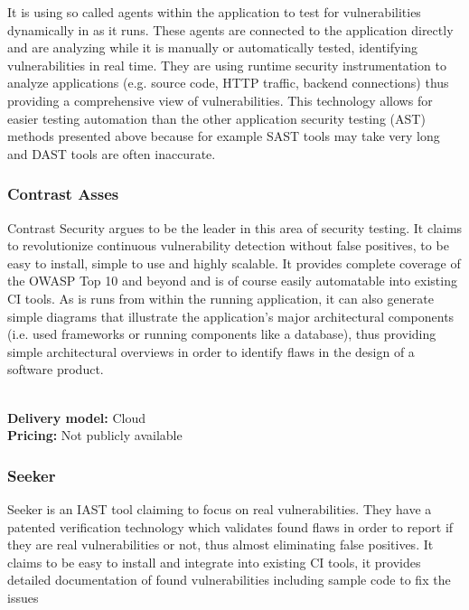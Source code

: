 \documentclass[conference]{IEEEtran}
\begin{document}
It is using so called agents within the application to test for vulnerabilities dynamically in as it runs. These agents are connected to the application directly and are analyzing while it is manually or automatically tested, identifying vulnerabilities in real time. They are using runtime security instrumentation to analyze applications (e.g. source code, HTTP traffic, backend connections) thus providing a comprehensive view of vulnerabilities. This technology allows for easier testing automation than the other application security testing (AST) methods presented above because for example SAST tools may take very long and DAST tools are often inaccurate.\\

\subsubsection{Contrast Asses \cite{iast1}}

Contrast Security argues to be the leader in this area of security testing. It claims to revolutionize continuous vulnerability detection without false positives, to be easy to install, simple to use and highly scalable. It provides complete coverage of the OWASP Top 10 and beyond and is of course easily automatable into existing CI tools. As is runs from within the running application, it can also generate simple diagrams that illustrate the application’s major architectural components (i.e. used frameworks or running components like a database), thus providing simple architectural overviews in order to identify flaws in the design of a software product.

\noindent\\
\textbf{Delivery model:} Cloud
\noindent\\
\textbf{Pricing:} Not publicly available
\\

\subsubsection{Seeker \cite{iast2}}

Seeker is an IAST tool claiming to focus on real vulnerabilities. They have a patented verification technology which validates found flaws in order to report if they are real vulnerabilities or not, thus almost eliminating false positives. It claims to be easy to install and integrate into existing CI tools, it provides detailed documentation of found vulnerabilities including sample code to fix the issues
\end{document}
